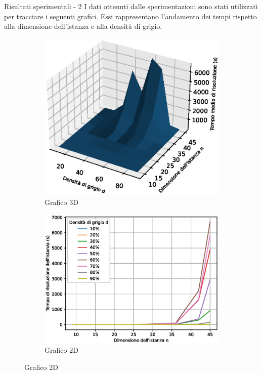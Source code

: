 \documentclass[a4paper]{beamer}
\begin{document}
\begin{frame}{Risultati sperimentali - 2}
	I dati ottenuti dalle sperimentazioni sono stati utilizzati per tracciare i seguenti grafici. Essi rappresentano
	l'andamento dei tempi rispetto alla dimensione dell'istanza e alla densità di grigio.
	\begin{figure}[h!]
		\centering
		\begin{subfigure}[b]{0.41\textwidth}
			\includegraphics[width=\textwidth]{images/resolution_times.eps}
			\caption{Grafico 3D}
		\end{subfigure}
		\hspace{2em}
		\begin{subfigure}[b]{0.49\textwidth}
			\includegraphics[width=\textwidth]{images/resolution_times2.eps}
			\caption{Grafico 2D}
		\end{subfigure}
	\end{figure}
\end{frame}
\end{document}
